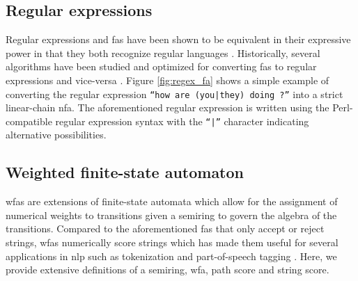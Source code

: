 \subsection{Regular expressions}

Regular expressions and \ac{fas} have been shown to be equivalent in their
expressive power in that they both recognize regular languages
\citep{sipser1996introduction}. Historically, several algorithms have been
studied and optimized for converting \ac{fas} to regular expressions and vice-versa
\citep{mcnaughton1960regular,thompson1968programming}. Figure \ref{fig:regex_fa}
shows a simple example of converting the regular expression \texttt{``how are
  (you|they) doing ?''} into a strict linear-chain \ac{nfa}. The aforementioned
regular expression is written using the Perl-compatible regular expression
syntax with the \texttt{``|''} character indicating alternative possibilities.

\subsection{Weighted finite-state automaton}

\ac{wfas} are extensions of finite-state automata
which allow for the assignment of numerical weights to transitions given a
semiring to govern the algebra of the transitions. Compared to
the aforementioned \ac{fas} that only accept or reject strings, \ac{wfas} numerically
score strings which has made them useful for several applications in \ac{nlp} such as
tokenization and part-of-speech tagging \citep{maletti2017survey}. Here, we provide
extensive definitions of a semiring, \ac{wfa}, path score and string score.

